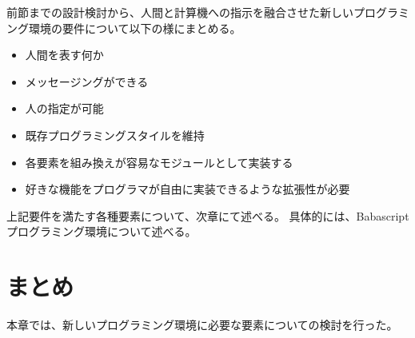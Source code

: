 前節までの設計検討から、人間と計算機への指示を融合させた新しいプログラミング環境の要件について以下の様にまとめる。

\begin{itemize}
\itemsep1pt\parskip0pt
\item
  人間を表す何か
\item
  メッセージングができる
\item
  人の指定が可能
\item
  既存プログラミングスタイルを維持
\item
  各要素を組み換えが容易なモジュールとして実装する
\item
  好きな機能をプログラマが自由に実装できるような拡張性が必要
\end{itemize}

上記要件を満たす各種要素について、次章にて述べる。
具体的には、Babascriptプログラミング環境について述べる。

\section{まとめ}\label{ux307eux3068ux3081}

本章では、新しいプログラミング環境に必要な要素についての検討を行った。
